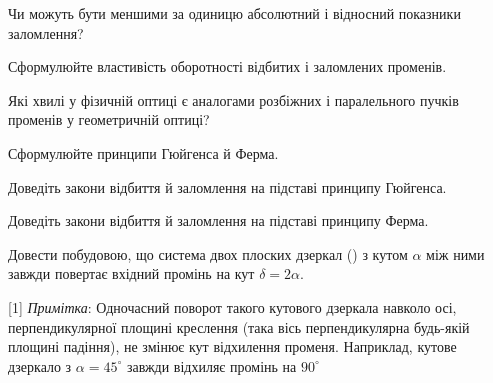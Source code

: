 \begin{problem}
Чи можуть бути меншими за одиницю абсолютний і відносний показники заломлення?
\end{problem}


\begin{problem}
Сформулюйте властивість оборотності відбитих і заломлених променів.
\end{problem}


\begin{problem}
Які хвилі у фізичній оптиці є аналогами розбіжних і паралельного пучків променів у геометричній оптиці?
\end{problem}


\begin{problem}
Сформулюйте принципи Гюйгенса й Ферма.
\end{problem}


\begin{problem}
Доведіть закони відбиття й заломлення на підставі принципу
Гюйгенса.
\end{problem}

\begin{problem}
Доведіть закони відбиття й заломлення на підставі принципу Ферма.
\end{problem}


\begin{problem}%
    Довести побудовою, що система двох плоских дзеркал () з кутом $\alpha$ між ними завжди повертає вхідний промінь на кут $\delta = 2\alpha$.

    \medskip

    [1]
    \emph{Примітка}: Одночасний поворот такого кутового дзеркала навколо осі, перпендикулярної площині креслення (така вісь перпендикулярна будь-якій площині падіння), не змінює кут відхилення променя. Наприклад, кутове дзеркало з $\alpha = 45^\circ$ завжди відхиляє промінь на $90^\circ$
\end{problem}

